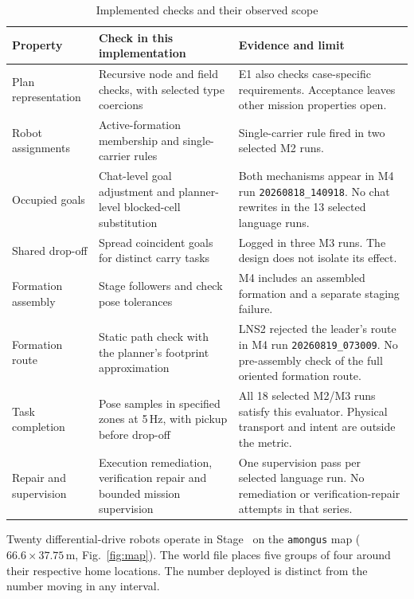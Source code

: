 \documentclass[pdflatex,sn-mathphys-num]{sn-jnl}
\newcommand{\code}[1]{{\def\{{\textnormal{\textbraceleft}}\def\}{\textnormal{\textbraceright}}\texttt{#1}}}
\begin{document}
\begin{table}[!htbp]
\caption{Implemented checks and their observed scope}
\label{tab:coverage}
\centering
\setlength{\tabcolsep}{4pt}
\begin{tabular}{>{\raggedright\arraybackslash}p{}
                >{\raggedright\arraybackslash}p{}
                >{\raggedright\arraybackslash}p{}}
\toprule
Property & Check in this implementation & Evidence and limit \\
\midrule
Plan representation & Recursive node and field checks, with selected type coercions
 & E1 also checks case-specific requirements. Acceptance leaves other mission properties open. \\
Robot assignments & Active-formation membership and single-carrier rules
 & Single-carrier rule fired in two selected M2 runs. \\
Occupied goals & Chat-level goal adjustment and planner-level blocked-cell substitution
 & Both mechanisms appear in M4 run \code{20260818\_140918}. No chat rewrites in the 13 selected language runs. \\
Shared drop-off & Spread coincident goals for distinct carry tasks
 & Logged in three M3 runs. The design does not isolate its effect. \\
Formation assembly & Stage followers and check pose tolerances
 & M4 includes an assembled formation and a separate staging failure. \\
Formation route & Static path check with the planner's footprint approximation
 & LNS2 rejected the leader's route in M4 run \code{20260819\_073009}. No pre-assembly check of the full oriented formation route. \\
Task completion & Pose samples in specified zones at 5\,Hz, with pickup before drop-off
 & All 18 selected M2/M3 runs satisfy this evaluator. Physical transport and intent are outside the metric. \\
Repair and supervision & Execution remediation, verification repair and bounded mission supervision
 & One supervision pass per selected language run. No remediation or verification-repair attempts in that series. \\
\bottomrule
\end{tabular}
\end{table}

Twenty differential-drive robots operate in Stage~\citep{stage} on the
\code{amongus} map ($66.6 \times 37.75$\,m, Fig.~\ref{fig:map}). The world
file places five groups of four around their respective home locations.
The number deployed is distinct from the number moving in any interval.
\end{document}
